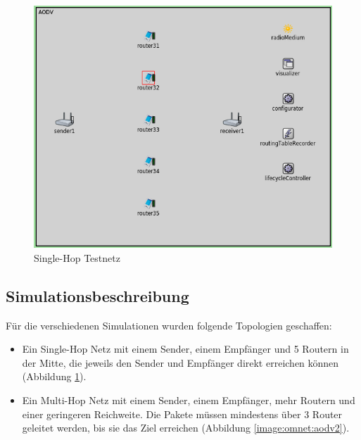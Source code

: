\begin{figure}
  \centering
  \includegraphics[scale=0.35]{bilder/aodv1.png}
  \caption{Single-Hop Testnetz}
  \label{image:omnet:aodv1}
\end{figure}

\subsection{Simulationsbeschreibung}
\label{chapter:versuch:aufbau:sim}

Für die verschiedenen Simulationen wurden folgende Topologien geschaffen:

\begin{itemize}
\item Ein Single-Hop Netz mit einem Sender, einem Empfänger und 5 Routern in der Mitte, die jeweils den Sender und Empfänger direkt erreichen können (Abbildung \ref{image:omnet:aodv1}).
\item Ein Multi-Hop Netz mit einem Sender, einem Empfänger, mehr Routern und einer geringeren Reichweite. Die Pakete müssen mindestens über 3 Router geleitet werden, bis sie das Ziel erreichen (Abbildung \ref{image:omnet:aodv2}).
\end{itemize}

